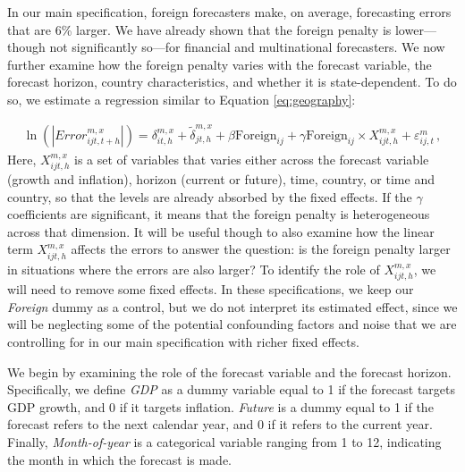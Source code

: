 
In our main specification, foreign forecasters make, on average, forecasting errors that are 6\% larger. We have already shown that the foreign penalty is lower—though not significantly so—for financial and multinational forecasters. We now further examine how the foreign penalty varies with the forecast variable, the forecast horizon, country characteristics, and whether it is state-dependent. To do so, we estimate a regression similar to Equation \eqref{eq:geography}:


\begin{align}
	\ln(|Error_{ijt,t+h}^{m,x}|)= \delta_{it,h}^{m,x} +\tilde\delta_{jt,h}^{m,x} +  \beta \text{Foreign}_{ij} +\gamma \text{Foreign}_{ij}\times X_{ijt,h}^{m,x}+ \varepsilon_{ij,t}^m  \,, \label{eq:heterogeneity}
\end{align}
Here, $X_{ijt,h}^{m,x}$ is a set of variables that varies either across the forecast variable (growth and inflation), horizon (current or future), time, country, or time and country, so that the levels are already absorbed by the fixed effects. If the $\gamma$ coefficients are significant, it means that the foreign penalty is heterogeneous across that dimension. It will be useful though to also examine how the linear term $X_{ijt,h}^{m,x}$ affects the errors to answer the question: is the foreign penalty larger in situations where the errors are also larger? To identify the role of $X_{ijt,h}^{m,x}$, we will need to remove some fixed effects. In these specifications, we keep our \textit{Foreign} dummy as a control, but we do not interpret its estimated effect, since we will be neglecting some of the potential confounding factors and noise that we are controlling for in our main specification with richer fixed effects.

We begin by examining the role of the forecast variable and the forecast horizon. Specifically, we define \textit{GDP} as a dummy variable equal to 1 if the forecast targets GDP growth, and 0 if it targets inflation. \textit{Future} is a dummy equal to 1 if the forecast refers to the next calendar year, and 0 if it refers to the current year. Finally, \textit{Month-of-year} is a categorical variable ranging from 1 to 12, indicating the month in which the forecast is made.


